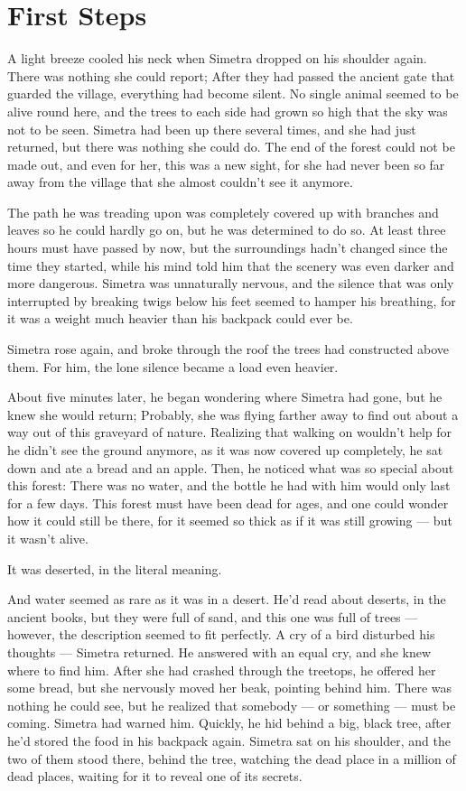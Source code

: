 \chapter{First Steps}
\label{cha:first-steps}
A light breeze cooled his neck when Simetra dropped on his shoulder again. There was nothing she could report; After they had passed the ancient gate that guarded the village, everything had become silent. No single animal seemed to be alive round here, and the trees to each side had grown so high that the sky was not to be seen. 
Simetra had been up there several times, and she had just returned, but there was nothing she could do. The end of the forest could not be made out, and even for her, this was a new sight, for she had never been so far away from the village that she almost couldn't see it anymore. 

The path he was treading upon was completely covered up with branches and leaves so he could hardly go on, but he was determined to do so. At least three hours must have passed by now, but the surroundings hadn't changed since the time they started, while his mind told him that the scenery was even darker and more dangerous. Simetra was unnaturally nervous, and the silence that was only interrupted by breaking twigs below his feet seemed to hamper his breathing, for it was a weight much heavier than his backpack could ever be.

Simetra rose again, and broke through the roof the trees had constructed above them. For him, the lone silence became a load even heavier.

About five minutes later, he began wondering where Simetra had gone, but he knew she would return; Probably, she was flying farther away to find out about a way out of this graveyard of nature. Realizing that walking on wouldn't help for he didn't see the ground anymore, as it was now covered up completely, he sat down and ate a bread and an apple. Then, he noticed what was so special about this forest: There was no water, and the bottle he had with him would only last for a few days. This forest must have been dead for ages, and one could wonder how it could still be there, for it seemed so thick as if it was still growing --- but it wasn't alive. 

It was deserted, in the literal meaning. 

And water seemed as rare as it was in a desert. He'd read about deserts, in the ancient books, but they were full of sand, and this one was full of trees --- however, the description seemed to fit perfectly. 
A cry of a bird disturbed his thoughts --- Simetra returned. He answered with an equal cry, and she knew where to find him. After she had crashed through the treetops, he offered her some bread, but she nervously moved her beak, pointing behind him. There was nothing he could see, but he realized that somebody --- or something --- must be coming. Simetra had warned him. 
Quickly, he hid behind a big, black tree, after he'd stored the food in his backpack again. Simetra sat on his shoulder, and the two of them stood there, behind the tree, watching the dead place in a million of dead places, waiting for it to reveal one of its secrets.

